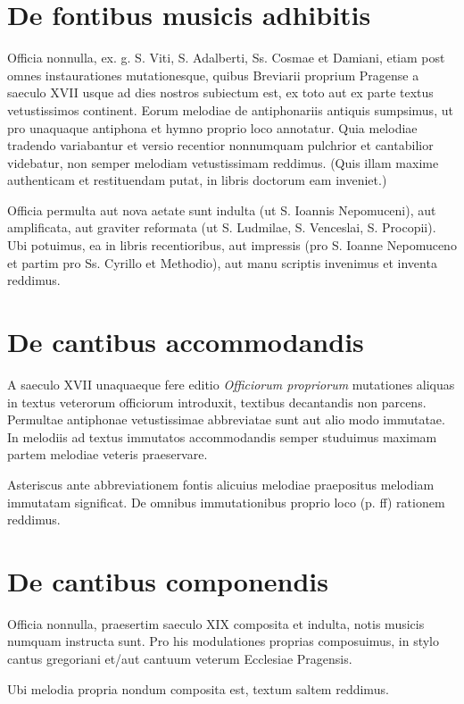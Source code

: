 \section*{De fontibus musicis adhibitis}
Officia nonnulla, ex. g. S. Viti, S. Adalberti, Ss. Cosmae et Damiani,
etiam post omnes instaurationes mutationesque, quibus
Breviarii proprium Pragense a saeculo XVII usque ad dies nostros
subiectum est, ex toto aut ex parte textus vetustissimos
continent.
Eorum melodiae de antiphonariis antiquis sumpsimus,
ut pro unaquaque antiphona et hymno proprio loco annotatur.
Quia melodiae tradendo variabantur et versio recentior nonnumquam
pulchrior et cantabilior videbatur, non semper melodiam
vetustissimam reddimus.
(Quis illam maxime authenticam et restituendam putat,
in libris doctorum eam inveniet.)

Officia permulta aut nova aetate sunt indulta
(ut S. Ioannis Nepomuceni),
aut amplificata,
aut graviter reformata (ut S. Ludmilae, S. Venceslai, S. Procopii).
Ubi potuimus, ea in libris recentioribus, aut impressis
(pro S. Ioanne Nepomuceno et partim pro Ss. Cyrillo et Methodio),
aut manu scriptis invenimus et inventa reddimus.

\section*{De cantibus accommodandis}
A saeculo XVII unaquaeque fere editio \emph{Officiorum propriorum}
mutationes aliquas in textus veterorum officiorum introduxit,
textibus decantandis non parcens.
Permultae antiphonae vetustissimae abbreviatae sunt aut
alio modo immutatae.
In melodiis ad textus immutatos accommodandis semper studuimus
maximam partem melodiae veteris praeservare.

Asteriscus ante abbreviationem fontis alicuius melodiae praepositus
melodiam immutatam significat.
De omnibus immutationibus proprio loco (p. \pageref{pars:annotationes}ff)
rationem reddimus.

\section*{De cantibus componendis}
Officia nonnulla, praesertim saeculo XIX composita et indulta,
notis musicis numquam instructa sunt.
Pro his modulationes proprias composuimus, in stylo cantus gregoriani
et/aut cantuum veterum Ecclesiae Pragensis.

Ubi melodia propria nondum composita est, textum saltem reddimus.

